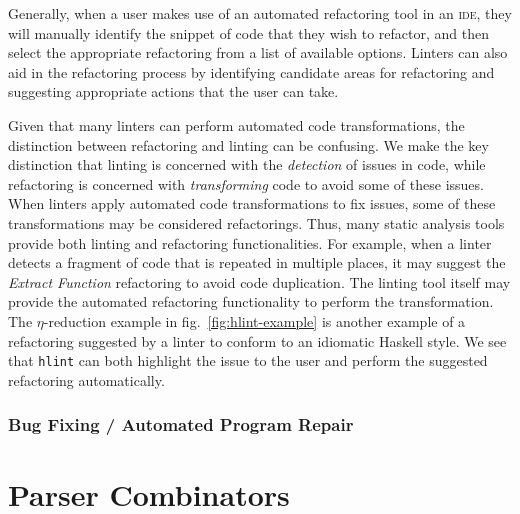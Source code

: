 Generally, when a user makes use of an automated refactoring tool in an \textsc{ide}, they will manually identify the snippet of code that they wish to refactor, and then select the appropriate refactoring from a list of available options.
Linters can also aid in the refactoring process by identifying candidate areas for refactoring and suggesting appropriate actions that the user can take.

Given that many linters can perform automated code transformations, the distinction between refactoring and linting can be confusing.
We make the key distinction that linting is concerned with the \textit{detection} of issues in code, while refactoring is concerned with \textit{transforming} code to avoid some of these issues.
When linters apply automated code transformations to fix issues, some of these transformations may be considered refactorings.
Thus, many static analysis tools provide both linting and refactoring functionalities.
For example, when a linter detects a fragment of code that is repeated in multiple places, it may suggest the \textit{Extract Function} refactoring to avoid code duplication.
The linting tool itself may provide the automated refactoring functionality to perform the transformation.
The $\eta$-reduction example in fig.~\ref{fig:hlint-example} is another example of a refactoring suggested by a linter to conform to an idiomatic Haskell style.
We see that \texttt{hlint} can both highlight the issue to the user and perform the suggested refactoring automatically.

\subsection{Bug Fixing / Automated Program Repair}


\chapter{Parser Combinators}
